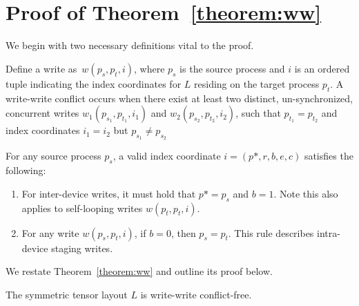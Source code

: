 \section{Proof of Theorem~\ref{theorem:ww}}\label{sec:proof-of-theorem}
We begin with two necessary definitions vital to the proof.
\begin{definition}
    Define a write as~$w(p_s, p_t, i)$, where $p_s$ is the source process and $i$ is an ordered tuple
    indicating the index coordinates for $L$ residing on the target process $p_t$.
    A write-write conflict occurs when there exist at least two distinct, un-synchronized, concurrent writes
    $w_1(p_{s_1}, p_{t_1}, i_1)$ and $w_2(p_{s_2}, p_{t_2}, i_2)$, such that
    $p_{t_1} = p_{t_2}$ and index coordinates $i_1 = i_2$ but $p_{s_1} \neq p_{s_2}$
\end{definition}
\begin{definition}
    For any source process $p_s$, a valid index coordinate $i = (p*, r, b, e, c)$ satisfies the following:
    \begin{enumerate}
        \item For inter-device writes, it must hold that $p* = p_s$ and $b = 1$.
        Note this also applies to self-looping writes $w(p_t, p_t, i)$.
        \item For any write $w(p_s, p_t, i)$, if $b = 0$, then $p_s = p_t$.
        This rule describes intra-device staging writes.
    \end{enumerate}
\end{definition}
We restate Theorem~\ref{theorem:ww} and outline its proof below.
\begin{theorem}\label{theorem:ww2}
The symmetric tensor layout $L$ is write-write conflict-free.
\end{theorem}
